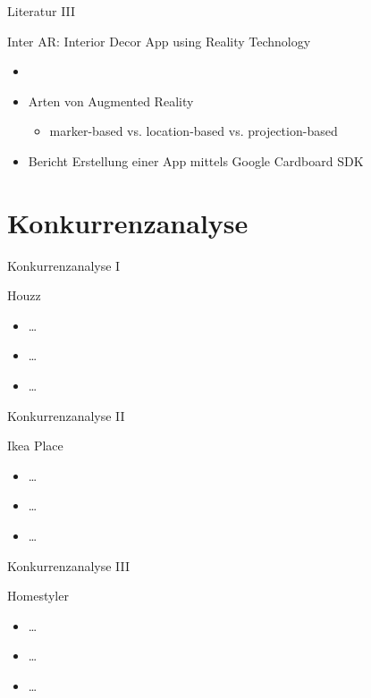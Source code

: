 \documentclass[presentation,bigger,aspectratio=169]{beamer}
\begin{document}
\begin{frame}[label={sec:org61e381b}]{Literatur III}
\begin{block}{Inter AR: Interior Decor App using Reality Technology}
\begin{itemize}
\item \textcite{moaresInterARInterior2020}
\item Arten von Augmented Reality
\begin{itemize}
\item marker-based vs. location-based vs. projection-based
\end{itemize}
\item Bericht Erstellung einer App mittels Google Cardboard SDK
\end{itemize}
\end{block}
\end{frame}

\section{Konkurrenzanalyse}
\label{sec:orga55a661}
\begin{frame}[label={sec:org3ba9ff0}]{\vspace{2.2cm}\begin{center}\MakeUppercase{\insertsection}\end{center}}
\end{frame}

\begin{frame}[label={sec:org803044f}]{Konkurrenzanalyse I}
\begin{block}{Houzz}
\begin{itemize}
\item \ldots{}
\item \ldots{}
\item \ldots{}
\end{itemize}
\end{block}
\end{frame}
\begin{frame}[label={sec:org2cc433d}]{Konkurrenzanalyse II}
\begin{block}{Ikea Place}
\begin{itemize}
\item \ldots{}
\item \ldots{}
\item \ldots{}
\end{itemize}
\end{block}
\end{frame}
\begin{frame}[label={sec:org4267e32}]{Konkurrenzanalyse III}
\begin{block}{Homestyler}
\begin{itemize}
\item \ldots{}
\item \ldots{}
\item \ldots{}
\end{itemize}
\end{block}
\end{frame}
\end{document}
